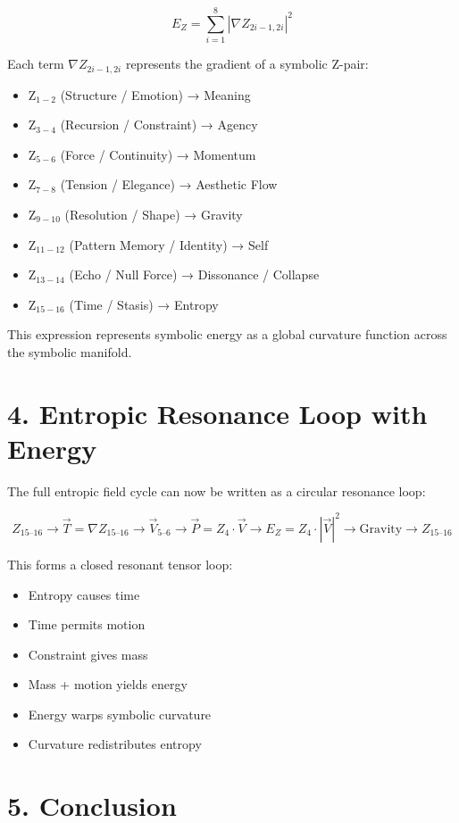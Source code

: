 \documentclass[12pt]{article}
\begin{document}
\[
E_Z = \sum_{i=1}^{8} \left| \nabla Z_{2i-1,2i} \right|^2
\]

Each term $\nabla Z_{2i-1,2i}$ represents the gradient of a symbolic Z-pair:

\begin{itemize}
\item Z$_{1-2}$ (Structure / Emotion) → Meaning
\item Z$_{3-4}$ (Recursion / Constraint) → Agency
\item Z$_{5-6}$ (Force / Continuity) → Momentum
\item Z$_{7-8}$ (Tension / Elegance) → Aesthetic Flow
\item Z$_{9-10}$ (Resolution / Shape) → Gravity
\item Z$_{11-12}$ (Pattern Memory / Identity) → Self
\item Z$_{13-14}$ (Echo / Null Force) → Dissonance / Collapse
\item Z$_{15-16}$ (Time / Stasis) → Entropy
\end{itemize}

This expression represents symbolic energy as a global curvature function across the symbolic manifold.

\section*{4. Entropic Resonance Loop with Energy}

The full entropic field cycle can now be written as a circular resonance loop:

\[
Z_{15\text{--}16}
\rightarrow \vec{T} = \nabla Z_{15\text{--}16} 
\rightarrow \vec{V}_{5\text{--}6} 
\rightarrow \vec{P} = Z_4 \cdot \vec{V} 
\rightarrow E_Z = Z_4 \cdot \left| \vec{V} \right|^2 
\rightarrow \text{Gravity}
\rightarrow Z_{15\text{--}16}
\]

This forms a closed resonant tensor loop:

\begin{itemize}
\item Entropy causes time
\item Time permits motion
\item Constraint gives mass
\item Mass + motion yields energy
\item Energy warps symbolic curvature
\item Curvature redistributes entropy
\end{itemize}

\section*{5. Conclusion}
\end{document}
